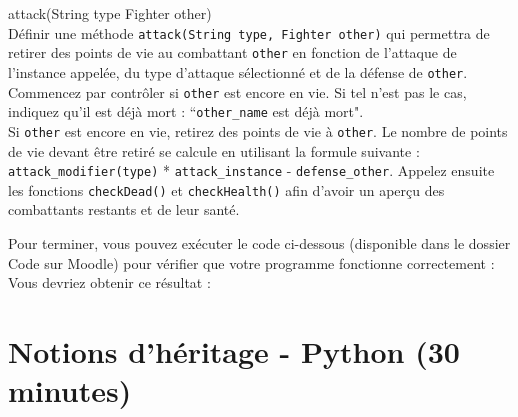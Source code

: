 \begin{Exercice}[10 minutes] attack(String type Fighter other)\\
    Définir une méthode \lstinline{attack(String type, Fighter other)} qui permettra de retirer des points de vie au combattant \lstinline{other} en fonction de l'attaque de l'instance appelée, du type d'attaque sélectionné et de la défense de \lstinline{other}. \\
    
    Commencez par contrôler si \lstinline{other} est encore en vie. Si tel n'est pas le cas, indiquez qu'il est déjà mort : ``\lstinline{other_name} est déjà mort". \\
     Si \lstinline{other} est encore en vie, retirez des points de vie à \lstinline{other}. Le nombre de points de vie devant être retiré se calcule en utilisant la formule suivante : \lstinline{attack_modifier(type)} * \lstinline{attack_instance} - \lstinline{defense_other}. Appelez ensuite les fonctions \lstinline{checkDead()} et \lstinline{checkHealth()} afin d'avoir un aperçu des combattants restants et de leur santé.
    
\begin{solution}
	
\end{solution}
\end{Exercice}
Pour terminer, vous pouvez exécuter le code ci-dessous (disponible dans le dossier Code sur Moodle) pour vérifier que votre programme fonctionne correctement : \\

Vous devriez obtenir ce résultat : 



\section{Notions d'héritage - Python (30 minutes)}

